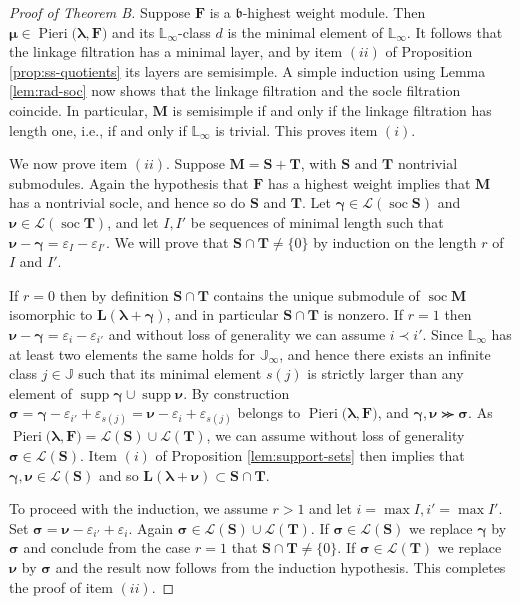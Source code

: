 \documentclass[11pt,fleqn]{amsart}
\newcommand\JJ{\mathbb J}
\newcommand\LL{\mathbb L}
\renewcommand\epsilon{\varepsilon}
\theoremstyle{definition}
\theoremstyle{remark}
\theoremstyle{remark}
\newcommand\lie[1]{\mathfrak{#1}}
\newcommand\wt[1]{\boldsymbol{#1}}
\DeclareMathOperator\soc{soc}
\DeclareMathOperator\supp{supp}
\newcommand\Pieri[2]{\operatorname{Pieri}{(#1},{#2)}}
\begin{document}
\begin{proof}[Proof of Theorem B]
Suppose $\mathbf F$ is a $\lie b$-highest weight module. Then $\wt\mu \in 
\Pieri{\wt\lambda}{\mathbf F}$ and its $\LL_\infty$-class $d$ is the minimal
element of $\LL_\infty$. It follows that the linkage filtration has a minimal
layer, and by item $(ii)$ of Proposition \ref{prop:ss-quotients} its layers
are semisimple. A simple induction using Lemma \ref{lem:rad-soc} now shows
that the linkage filtration and the socle filtration coincide. In particular,
$\mathbf M$ is semisimple if and only if the linkage filtration has length one, 
i.e., if and only if $\LL_\infty$ is trivial. This proves item $(i)$.

We now prove item $(ii)$. Suppose $\mathbf M = \mathbf S + \mathbf T$, with 
$\mathbf S$ and $\mathbf T$ nontrivial submodules. Again the hypothesis that 
$\mathbf F$ has a highest weight implies that $\mathbf M$ has a 
nontrivial socle, and hence so do $\mathbf S$ and $\mathbf T$. Let $\wt\gamma
\in \mathcal L(\soc \mathbf S)$ and $\wt\nu \in \mathcal L(\soc \mathbf T)$,
and let $I, I'$ be sequences of minimal length such that $\wt\nu - \wt\gamma =
\epsilon_I - \epsilon_{I'}$. We will prove that $\mathbf S \cap \mathbf T \neq 
\{0\}$ by induction on the length $r$ of $I$ and $I'$.

If $r = 0$ then by definition $\mathbf S \cap \mathbf T$ contains the unique 
submodule of $\soc \mathbf M$ isomorphic to $\mathbf L(\wt\lambda + \wt\gamma)$,
and in particular $\mathbf S \cap \mathbf T$ is nonzero. If $r = 1$ then $\wt\nu - 
\wt\gamma = 
\epsilon_i - \epsilon_{i'}$ and without loss of generality we can assume $i 
\prec i'$. Since $\LL_\infty$ has at least two elements the same holds for 
$\JJ_\infty$, and hence there exists an infinite class $j \in \JJ$ such that 
its minimal element $s(j)$ is strictly larger than any element of $\supp 
\wt\gamma \cup \supp \wt\nu$. By construction $\wt\sigma = \wt\gamma - 
\epsilon_{i'} + \epsilon_{s(j)} = \wt\nu - \epsilon_i + \epsilon_{s(j)}$ 
belongs to $\Pieri{\wt\lambda}{\mathbf F}$, and $\wt\gamma, \wt\nu \ggcurly 
\wt\sigma$. As $\Pieri{\wt\lambda}{\mathbf F} = \mathcal L(\mathbf S) \cup 
\mathcal L(\mathbf T)$, we can assume without loss of generality $\wt\sigma
\in \mathcal L(\mathbf S)$. Item $(i)$ of Proposition \ref{lem:support-sets} 
then implies that $\wt\gamma, \wt\nu \in \mathcal L(\mathbf S)$ and so $\mathbf 
L(\wt\lambda + \wt\nu) \subset \mathbf S \cap \mathbf T$.

To proceed with the induction, we assume $r > 1$ and let $i = \max I, i' = \max 
I'$. Set $\wt\sigma = \wt\nu - \epsilon_{i'} + \epsilon_i$. Again $\wt\sigma 
\in \mathcal L(\mathbf S) \cup \mathcal L(\mathbf T)$. If $\wt\sigma \in 
\mathcal L(\mathbf S)$ we replace $\wt\gamma$ by $\wt\sigma$ and conclude 
from the case $r = 1$ that $\mathbf S \cap \mathbf T \neq \{0\}$. If $\wt\sigma 
\in \mathcal L(\mathbf T)$ we replace $\wt\nu$ by $\wt\sigma$ and the 
result now follows from the induction hypothesis. This completes the proof of 
item $(ii)$.


\end{proof}
\end{document}
